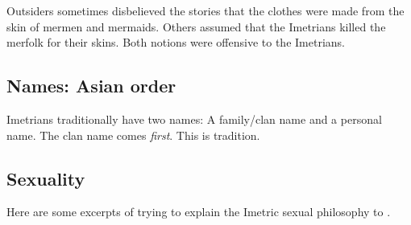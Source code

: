 Outsiders sometimes disbelieved the stories that the clothes were made from the skin of mermen and mermaids. 
Others assumed that the Imetrians killed the merfolk for their skins. 
Both notions were offensive to the Imetrians. 









\subsection{Names: Asian order}
Imetrians traditionally have two names: 
A family/clan name and a personal name. 
The clan name comes \emph{first}. 
This is \Ortaican{} tradition. 









\subsection{Sexuality}
Here are some excerpts of  trying to explain the Imetric sexual philosophy to . 


